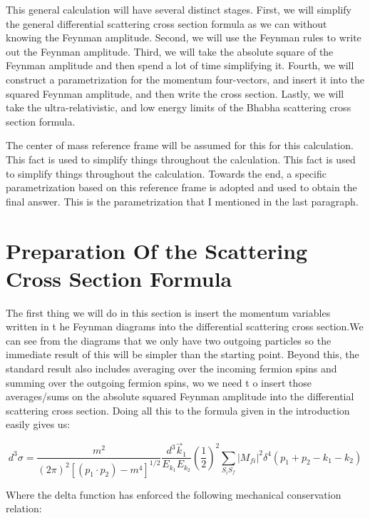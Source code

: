 \documentclass[a4]{article}
\begin{document}
    This general calculation will have several distinct stages. First, we will simplify the general differential scattering cross section formula as we can without knowing the Feynman amplitude.
    Second, we will use the Feynman rules to write out the Feynman amplitude. Third, we will take the absolute square of the Feynman amplitude and then spend a lot of time simplifying it. Fourth,
    we will construct a parametrization for the momentum four-vectors, and insert it into the squared Feynman amplitude, and then write the cross section. Lastly, we will take the ultra-relativistic,
    and low energy limits of the Bhabha scattering cross section formula.

    The center of mass reference frame will be assumed for this for this calculation. This fact is used to simplify things throughout the calculation. This fact is used to simplify things throughout
    the calculation. Towards the end, a specific parametrization based on this reference frame is adopted and used to obtain the final answer. This is the parametrization that I mentioned in the last
    paragraph.

    \section*{Preparation Of the Scattering Cross Section Formula}

    The first thing we will do in this section is insert the momentum variables written in t he Feynman diagrams into the differential scattering cross section.We can see from the diagrams that we only
    have two outgoing particles so the immediate result of this will be simpler than the starting point. Beyond this, the standard result also includes averaging over the incoming fermion spins and
    summing over the outgoing fermion spins, wo we need t o insert those averages/sums on the absolute squared Feynman amplitude into the differential scattering cross section. Doing all this to the
    formula given in the introduction easily gives us:

    \begin{equation}
        d^3 \sigma = \frac{m^2}{(2 \pi)^2 [(p_1 \cdot p_2) - m^4]^{1/2}} \frac{d^3 \vec{k}_1}{E_{k_1} E_{k_2}} (\frac{1}{2})^2 \sum_{S_i S_f} |M_{fi}|^2 \delta^4 (p_1 + p_2 - k_1 - k_2)
    \end{equation}

    Where the delta function has enforced the following mechanical conservation relation:
\end{document}
